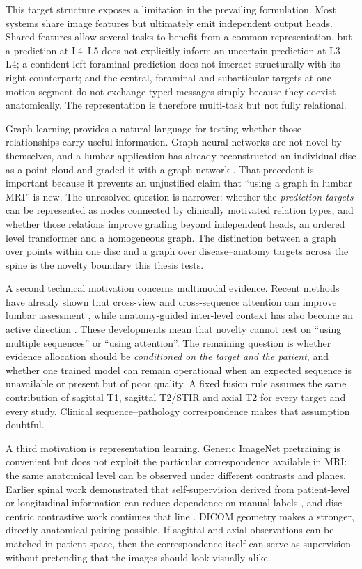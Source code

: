 This target structure exposes a limitation in the prevailing formulation. Most
systems share image features but ultimately emit independent output heads. Shared
features allow several tasks to benefit from a common representation, but a
prediction at L4--L5 does not explicitly inform an uncertain prediction at L3--L4;
a confident left foraminal prediction does not interact structurally with its right
counterpart; and the central, foraminal and subarticular targets at one motion
segment do not exchange typed messages simply because they coexist anatomically.
The representation is therefore multi-task but not fully relational.

Graph learning provides a natural language for testing whether those relationships
carry useful information. Graph neural networks are not novel by themselves, and a
lumbar application has already reconstructed an individual disc as a point cloud and
graded it with a graph network \cite{baur2024automated}. That precedent is important
because it prevents an unjustified claim that ``using a graph in lumbar MRI'' is new.
The unresolved question is narrower: whether the \emph{prediction targets} can be
represented as nodes connected by clinically motivated relation types, and whether
those relations improve grading beyond independent heads, an ordered level
transformer and a homogeneous graph. The distinction between a graph over points
within one disc and a graph over disease--anatomy targets across the spine is the
novelty boundary this thesis tests.

A second technical motivation concerns multimodal evidence. Recent methods have
already shown that cross-view and cross-sequence attention can improve lumbar
assessment \cite{batra2025mscan,nguyen2026crossspine}, while anatomy-guided
inter-level context has also become an active direction \cite{chai2026anatomy}.
These developments mean that novelty cannot rest on ``using multiple sequences'' or
``using attention''. The remaining question is whether evidence allocation should be
\emph{conditioned on the target and the patient}, and whether one trained model can
remain operational when an expected sequence is unavailable or present but of poor
quality. A fixed fusion rule assumes the same contribution of sagittal T1, sagittal
T2/STIR and axial T2 for every target and every study. Clinical sequence--pathology
correspondence makes that assumption doubtful.

A third motivation is representation learning. Generic ImageNet pretraining is
convenient but does not exploit the particular correspondence available in MRI: the
same anatomical level can be observed under different contrasts and planes. Earlier
spinal work demonstrated that self-supervision derived from patient-level or
longitudinal information can reduce dependence on manual labels
\cite{jamaludin2017selfsupervised}, and disc-centric contrastive work continues that
line \cite{acharya2026disccentric}. DICOM geometry makes a stronger, directly
anatomical pairing possible. If sagittal and axial observations can be matched in
patient space, then the correspondence itself can serve as supervision without
pretending that the images should look visually alike.


